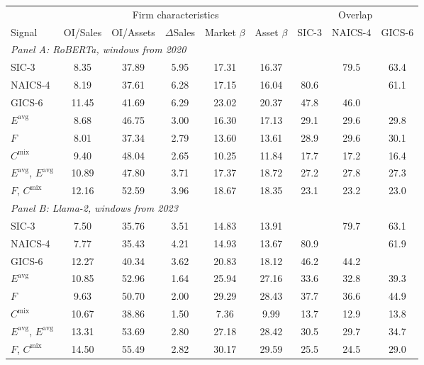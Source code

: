 \begin{table}[htbp]
{\footnotesize
\begin{adjustbox}{max width=\linewidth, max totalheight=0.75\textheight}
\begin{tabular}{lcccccccc}
\toprule
 & \multicolumn{5}{c}{Firm characteristics} & \multicolumn{3}{c}{Overlap} \\
\cmidrule(lr){2-6} \cmidrule(lr){7-9}
Signal & OI/Sales & OI/Assets & $\Delta$Sales & Market $\beta$ & Asset $\beta$ & SIC-3 & NAICS-4 & GICS-6 \\
\midrule
\multicolumn{9}{l}{\textit{Panel A: RoBERTa, windows from 2020}} \\
SIC-3 & \phantom{0}8.35 & 37.89 & 5.95 & 17.31 & 16.37 &  & 79.5 & 63.4 \\
NAICS-4 & \phantom{0}8.19 & 37.61 & 6.28 & 17.15 & 16.04 & 80.6 &  & 61.1 \\
GICS-6 & 11.45 & 41.69 & 6.29 & 23.02 & 20.37 & 47.8 & 46.0 &  \\
$E^{\mathrm{avg}}$ & \phantom{0}8.68 & 46.75 & 3.00 & 16.30 & 17.13 & 29.1 & 29.6 & 29.8 \\
$F$ & \phantom{0}8.01 & 37.34 & 2.79 & 13.60 & 13.61 & 28.9 & 29.6 & 30.1 \\
$C^{\mathrm{mix}}$ & \phantom{0}9.40 & 48.04 & 2.65 & 10.25 & 11.84 & 17.7 & 17.2 & 16.4 \\
$E^{\mathrm{avg}}$, $E^{\mathrm{avg}}$ & 10.89 & 47.80 & 3.71 & 17.37 & 18.72 & 27.2 & 27.8 & 27.3 \\
$F$, $C^{\mathrm{mix}}$ & 12.16 & 52.59 & 3.96 & 18.67 & 18.35 & 23.1 & 23.2 & 23.0 \\
\midrule
\multicolumn{9}{l}{\textit{Panel B: Llama-2, windows from 2023}} \\
SIC-3 & \phantom{0}7.50 & 35.76 & 3.51 & 14.83 & 13.91 &  & 79.7 & 63.1 \\
NAICS-4 & \phantom{0}7.77 & 35.43 & 4.21 & 14.93 & 13.67 & 80.9 &  & 61.9 \\
GICS-6 & 12.27 & 40.34 & 3.62 & 20.83 & 18.12 & 46.2 & 44.2 &  \\
$E^{\mathrm{avg}}$ & 10.85 & 52.96 & 1.64 & 25.94 & 27.16 & 33.6 & 32.8 & 39.3 \\
$F$ & \phantom{0}9.63 & 50.70 & 2.00 & 29.29 & 28.43 & 37.7 & 36.6 & 44.9 \\
$C^{\mathrm{mix}}$ & 10.67 & 38.86 & 1.50 & \phantom{0}7.36 & \phantom{0}9.99 & 13.7 & 12.9 & 13.8 \\
$E^{\mathrm{avg}}$, $E^{\mathrm{avg}}$ & 13.31 & 53.69 & 2.80 & 27.18 & 28.42 & 30.5 & 29.7 & 34.7 \\
$F$, $C^{\mathrm{mix}}$ & 14.50 & 55.49 & 2.82 & 30.17 & 29.59 & 25.5 & 24.5 & 29.0 \\
\bottomrule
\end{tabular}
\end{adjustbox}
}
\end{table}
